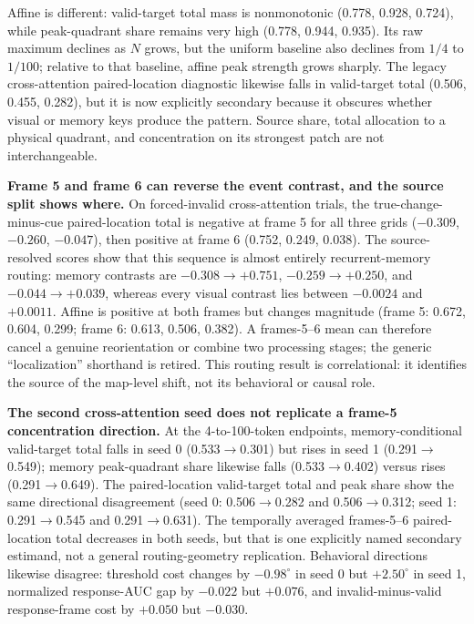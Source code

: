 \documentclass[10pt]{article}
\begin{document}
Affine is different: valid-target total mass is nonmonotonic (0.778, 0.928, 0.724), while peak-quadrant share remains very high (0.778, 0.944, 0.935). Its raw maximum declines as $N$ grows, but the uniform baseline also declines from $1/4$ to $1/100$; relative to that baseline, affine peak strength grows sharply. The legacy cross-attention paired-location diagnostic likewise falls in valid-target total (0.506, 0.455, 0.282), but it is now explicitly secondary because it obscures whether visual or memory keys produce the pattern. Source share, total allocation to a physical quadrant, and concentration on its strongest patch are not interchangeable.

\textbf{Frame 5 and frame 6 can reverse the event contrast, and the source split shows where.} On forced-invalid cross-attention trials, the true-change-minus-cue paired-location total is negative at frame 5 for all three grids ($-0.309$, $-0.260$, $-0.047$), then positive at frame 6 (0.752, 0.249, 0.038). The source-resolved scores show that this sequence is almost entirely recurrent-memory routing: memory contrasts are $-0.308\to+0.751$, $-0.259\to+0.250$, and $-0.044\to+0.039$, whereas every visual contrast lies between $-0.0024$ and $+0.0011$. Affine is positive at both frames but changes magnitude (frame 5: 0.672, 0.604, 0.299; frame 6: 0.613, 0.506, 0.382). A frames-5--6 mean can therefore cancel a genuine reorientation or combine two processing stages; the generic ``localization'' shorthand is retired. This routing result is correlational: it identifies the source of the map-level shift, not its behavioral or causal role.

\textbf{The second cross-attention seed does not replicate a frame-5 concentration direction.} At the 4-to-100-token endpoints, memory-conditional valid-target total falls in seed 0 (0.533$\to$0.301) but rises in seed 1 (0.291$\to$0.549); memory peak-quadrant share likewise falls (0.533$\to$0.402) versus rises (0.291$\to$0.649). The paired-location valid-target total and peak share show the same directional disagreement (seed 0: 0.506$\to$0.282 and 0.506$\to$0.312; seed 1: 0.291$\to$0.545 and 0.291$\to$0.631). The temporally averaged frames-5--6 paired-location total decreases in both seeds, but that is one explicitly named secondary estimand, not a general routing-geometry replication. Behavioral directions likewise disagree: threshold cost changes by $-0.98^\circ$ in seed 0 but $+2.50^\circ$ in seed 1, normalized response-AUC gap by $-0.022$ but $+0.076$, and invalid-minus-valid response-frame cost by $+0.050$ but $-0.030$.
\end{document}
